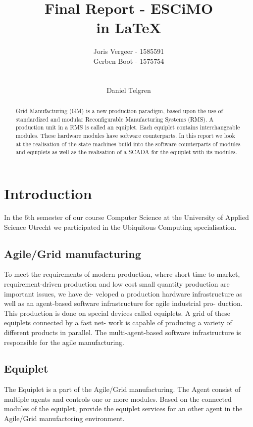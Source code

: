 \documentclass[12pt,a4paper]{report}
\title{
Final Report - ESCiMO \\
in \LaTeX{}
}
\author{
Joris Vergeer - 1585591\\
Gerben Boot - 1575754\\
\\
\\
Daniel Telgren
}
\begin{document}
\maketitle

\begin{abstract}
Grid Manufacturing (GM) is a new production paradigm, based upon the use of standardized and modular Reconfigurable Manufacturing Systems (RMS).\cite{SICE13}
A production unit in a RMS is called an equiplet.
Each equiplet contains interchangeable modules. 
These hardware modules have software counterparts.
In this report we look at the realisation of the state machines build into the software counterparts of modules and equiplets as well as the realisation of a SCADA for the equiplet with its modules.
\end{abstract}

\tableofcontents


\chapter{Introduction}
In the 6th semester of our course Computer Science at the University of Applied Science Utrecht we participated in the Ubiquitous Computing specialisation.

\section{Agile/Grid manufacturing}
To meet the requirements of modern production, where short
time to market, requirement-driven production and low cost
small quantity production are important issues, we have de-
veloped a production hardware infrastructure as well as an
agent-based software infrastructure for agile industrial pro-
duction. This production is done on special devices called
equiplets. A grid of these equiplets connected by a fast net-
work is capable of producing a variety of different products
in parallel. The multi-agent-based software infrastructure is
responsible for the agile manufacturing.\cite{Paper70}

\section{Equiplet}
The Equiplet is a part of the Agile/Grid manufacturing. The Agent consist of multiple agents and controls one or more modules. Based on the connected modules of the equiplet, provide the equiplet services for an other agent in the Agile/Grid manufactoring environment. 
\end{document}
